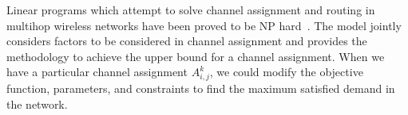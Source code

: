 

Linear programs which attempt to solve channel assignment and routing in multihop
wireless networks have been proved to be NP hard~\cite{tang2005interference,yuan2006cross}. 
The model jointly considers factors to be considered in channel 
assignment and provides the methodology to achieve the upper bound for a 
channel assignment.  When we have a particular channel assignment $A_{i,j}^k$, we could 
modify the objective function, parameters, and constraints to find the maximum 
satisfied demand in the network.  




